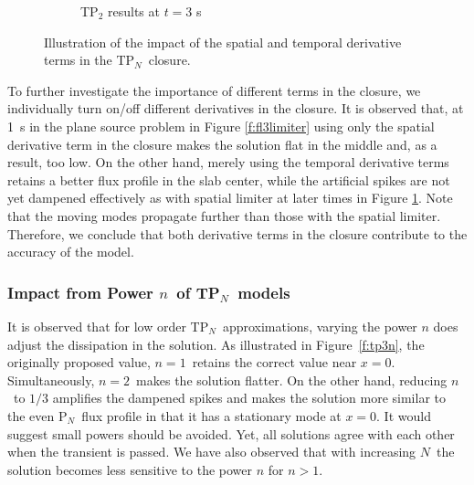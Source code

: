\documentclass[review]{elsarticle}
\newcommand{\pn}{P$_N$}
\newcommand{\dn}{D$_N$}
\begin{document}
\begin{figure}[ht!]
\begin{subfigure}{.5\textwidth}
		\caption{TP$_2$ results at $t = 3$ s}
		\label{f:fl5limiter}
	\end{subfigure}
	\caption{Illustration of the impact of the spatial and temporal derivative terms in the T\pn~closure.}
	\label{f:limiters}
\end{figure}

To further investigate the importance of different terms in the closure, we individually turn on/off different derivatives in the closure. It is observed that, at 1\ s in the plane source problem in Figure \ref{f:fl3limiter} using only the spatial derivative term in the closure makes the solution flat in the middle and, as a result, too low. On the other hand, merely using the temporal derivative terms retains a better flux profile in the slab center, while the artificial spikes are not yet dampened effectively as with spatial limiter at later times in Figure \ref{f:fl5limiter}. Note that the moving modes propagate further than those with the spatial limiter. Therefore, we conclude that both derivative terms in the closure contribute to the accuracy of the model. %


\subsubsection{Impact from Power $n$\ of T\pn\ models}
 It is observed that for low order T\pn\ approximations, varying the power $n$ does adjust the dissipation in the solution. As illustrated in Figure\ \ref{f:tp3n}, the originally proposed value, $n=1$\ retains the correct value near $x=0$. Simultaneously, $n=2$\ makes the solution flatter. On the other hand, reducing $n$\ to $1/3$ amplifies the dampened spikes and makes the solution more similar to the even \pn\ flux profile in that it has a stationary mode at $x=0$. It would suggest small powers should be avoided. Yet, all solutions agree with each other when the transient is passed.
We have also observed that with increasing $N$\ the solution becomes less sensitive to the power $n$ for $n>1$.
\end{document}
